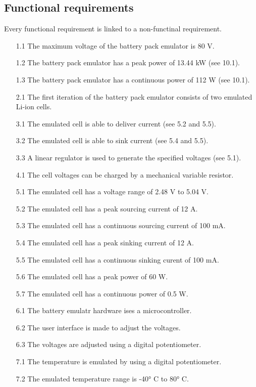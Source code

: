\subsection{Functional requirements}
Every functional requirement is linked to a non-functinal requirement. 
\begin{enumerate}
    \item[1.1] The maximum voltage of the battery pack emulator is 80 V.
    \item[1.2] The battery pack emulator has a peak power of 13.44 kW 
    (see 10.1).
    \item[1.3] The battery pack emulator has a continuous power of 112 W 
    (see 10.1).
    \item[2.1] The first iteration of the battery pack emulator consists of 
    two emulated Li-ion cells.
    \item[3.1] The emulated cell is able to deliver current (see 5.2 and 5.5).
    \item[3.2] The emulated cell is able to sink current (see 5.4 and 5.5).
    \item[3.3] A linear regulator is used to generate the specified voltages 
    (see 5.1).
    \item[4.1] The cell voltages can be charged by a mechanical variable 
    resistor. 
    \item[5.1] The emulated cell has a voltage range of 2.48 V to 5.04 V.
    \item[5.2] The emulated cell has a peak sourcing current of 12 A.
    \item[5.3] The emulated cell has a continuous sourcing current of 100 mA.
    \item[5.4] The emulated cell has a peak sinking current of 12 A.
    \item[5.5] The emulated cell has a continuous sinking curent of 100 mA.
    \item[5.6] The emulated cell has a peak power of 60 W.
    \item[5.7] The emulated cell has a continuous power of 0.5 W.
    \item[6.1] The battery emulatr hardware ises a microcontroller. 
    \item[6.2] The user interface is made to adjust the voltages. 
    \item[6.3] The voltages are adjusted using a digital potentiometer. 
    \item[7.1] The temperature is emulated by using a digital potentiometer.
    \item[7.2] The emulated temperature range is -40° C to 80° C.

\end{enumerate}
